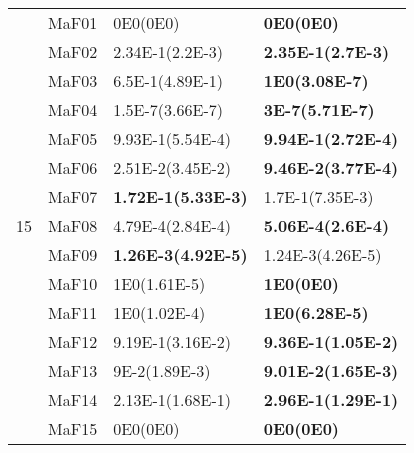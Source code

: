 \documentclass[]{article}
\begin{document}
\begin{table}
\begin{footnotesize}
\begin{tabular}{|l|l|l|l|}
\multirow{15}{*}{15} & MaF01 & \cellcolor{gray95} 0E0(0E0) & \cellcolor{gray95} {\bf 0E0(0E0)}\\
 & MaF02 & \cellcolor{gray95} 2.34E-1(2.2E-3) & \cellcolor{gray95} {\bf 2.35E-1(2.7E-3)}\\
 & MaF03 & 6.5E-1(4.89E-1) & \cellcolor{gray95} {\bf 1E0(3.08E-7)}\\
 & MaF04 & \cellcolor{gray95} 1.5E-7(3.66E-7) & \cellcolor{gray95} {\bf 3E-7(5.71E-7)}\\
 & MaF05 & 9.93E-1(5.54E-4) & \cellcolor{gray95} {\bf 9.94E-1(2.72E-4)}\\
 & MaF06 & 2.51E-2(3.45E-2) & \cellcolor{gray95} {\bf 9.46E-2(3.77E-4)}\\
 & MaF07 & \cellcolor{gray95} {\bf 1.72E-1(5.33E-3)} & \cellcolor{gray95} 1.7E-1(7.35E-3)\\
 & MaF08 & \cellcolor{gray95} 4.79E-4(2.84E-4) & \cellcolor{gray95} {\bf 5.06E-4(2.6E-4)}\\
 & MaF09 & \cellcolor{gray95} {\bf 1.26E-3(4.92E-5)} & \cellcolor{gray95} 1.24E-3(4.26E-5)\\
 & MaF10 & 1E0(1.61E-5) & \cellcolor{gray95} {\bf 1E0(0E0)}\\
 & MaF11 & 1E0(1.02E-4) & \cellcolor{gray95} {\bf 1E0(6.28E-5)}\\
 & MaF12 & 9.19E-1(3.16E-2) & \cellcolor{gray95} {\bf 9.36E-1(1.05E-2)}\\
 & MaF13 & \cellcolor{gray95} 9E-2(1.89E-3) & \cellcolor{gray95} {\bf 9.01E-2(1.65E-3)}\\
 & MaF14 & 2.13E-1(1.68E-1) & \cellcolor{gray95} {\bf 2.96E-1(1.29E-1)}\\
 & MaF15 & \cellcolor{gray95} 0E0(0E0) & \cellcolor{gray95} {\bf 0E0(0E0)}\\
\hline
\end{tabular}
\end{footnotesize}
\end{table}
\end{document}
